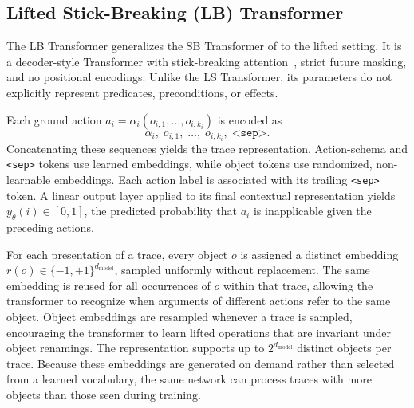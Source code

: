 \subsection{Lifted Stick-Breaking (LB) Transformer}
\label{sec:lb-transformer}
The LB Transformer generalizes the SB Transformer of
\citet{nunez2026strips} to the lifted \strips setting.
It is a decoder-style Transformer with stick-breaking
attention~\citep{tan2025scaling}, strict future masking, and no positional encodings. Unlike the LS Transformer, its parameters do not explicitly represent predicates, preconditions, or effects.

Each ground action
$a_i=\alpha_i(o_{i,1},\ldots,o_{i,k_i})$ is encoded as
\[
\alpha_i,\;o_{i,1},\;\ldots,\;o_{i,k_i},\;\texttt{<sep>}.
\]
Concatenating these sequences yields the trace representation.
Action-schema and \texttt{<sep>} tokens use learned embeddings, while object
tokens use randomized, non-learnable embeddings.
Each action label is associated with its trailing \texttt{<sep>} token.
A linear output layer applied to its final contextual representation yields
$y_\theta(i)\in[0,1]$, the predicted probability that $a_i$ is inapplicable
given the preceding actions.



For each presentation of a trace, every object $o$ is assigned a distinct embedding $r(o)\in\{-1,+1\}^{d_{\mathrm{model}}}$, sampled uniformly without
replacement. 
The same embedding is reused for all occurrences of $o$ within that trace, allowing the transformer to recognize when arguments of different actions refer to the same object. Object embeddings are resampled whenever a trace is sampled, encouraging the transformer to learn lifted operations that are invariant under object renamings. 
The representation supports up to
$2^{d_{\mathrm{model}}}$ distinct objects per trace.
Because these embeddings are generated on demand rather than selected from a
learned vocabulary, the same network can process traces with more objects than
those seen during training.